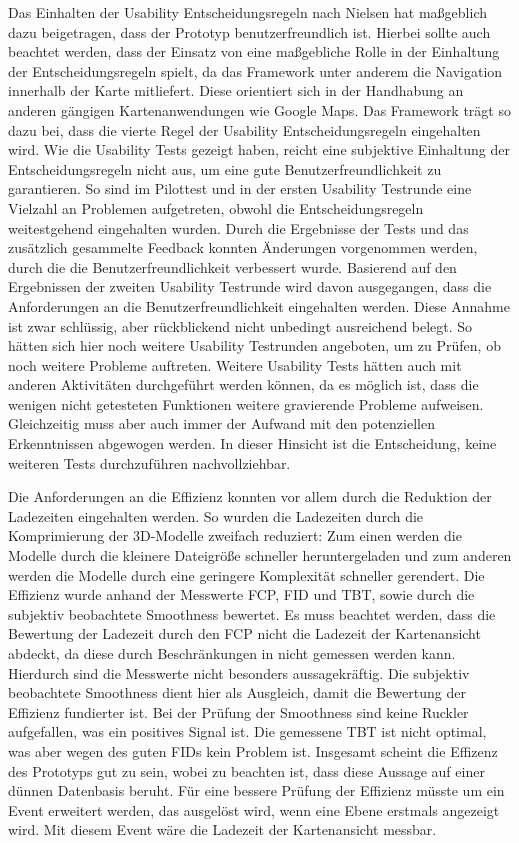 Das Einhalten der Usability Entscheidungsregeln nach Nielsen \cite{Nielsen.1994} hat maßgeblich dazu beigetragen, dass der Prototyp benutzerfreundlich ist. Hierbei sollte auch beachtet werden, dass der Einsatz von \deckgl{} eine maßgebliche Rolle in der Einhaltung der Entscheidungsregeln spielt, da das Framework unter anderem die Navigation innerhalb der Karte mitliefert. Diese orientiert sich in der Handhabung an anderen gängigen Kartenanwendungen wie Google Maps. Das Framework trägt so dazu bei, dass die vierte Regel der Usability Entscheidungsregeln \cite[Regel 4]{Nielsen.1994} eingehalten wird. Wie die Usability Tests gezeigt haben, reicht eine subjektive Einhaltung der Entscheidungsregeln nicht aus, um eine gute Benutzerfreundlichkeit zu garantieren. So sind im Pilottest und in der ersten Usability Testrunde eine Vielzahl an Problemen aufgetreten, obwohl die Entscheidungsregeln weitestgehend eingehalten wurden. Durch die Ergebnisse der Tests und das zusätzlich gesammelte Feedback konnten Änderungen vorgenommen werden, durch die die Benutzerfreundlichkeit verbessert wurde. Basierend auf den Ergebnissen der zweiten Usability Testrunde wird davon ausgegangen, dass die Anforderungen an die Benutzerfreundlichkeit eingehalten werden. Diese Annahme ist zwar schlüssig, aber rückblickend nicht unbedingt ausreichend belegt. So hätten sich hier noch weitere Usability Testrunden angeboten, um zu Prüfen, ob noch weitere Probleme auftreten. Weitere Usability Tests hätten auch mit anderen Aktivitäten durchgeführt werden können, da es möglich ist, dass die wenigen nicht getesteten Funktionen weitere gravierende Probleme aufweisen. Gleichzeitig muss aber auch immer der Aufwand mit den potenziellen Erkenntnissen abgewogen werden. In dieser Hinsicht ist die Entscheidung, keine weiteren Tests durchzuführen nachvollziehbar.

Die Anforderungen an die Effizienz konnten vor allem durch die Reduktion der Ladezeiten eingehalten werden. So wurden die Ladezeiten durch die Komprimierung der 3D-Modelle zweifach reduziert: Zum einen werden die Modelle durch die kleinere Dateigröße schneller heruntergeladen und zum anderen werden die Modelle durch eine geringere Komplexität schneller gerendert. Die Effizienz wurde anhand der Messwerte \ac{FCP}, \ac{FID} und \ac{TBT}, sowie durch die subjektiv beobachtete Smoothness bewertet. Es muss beachtet werden, dass die Bewertung der Ladezeit durch den \ac{FCP} nicht die Ladezeit der Kartenansicht abdeckt, da diese durch Beschränkungen in \deckgl{} nicht gemessen werden kann. Hierdurch sind die Messwerte nicht besonders aussagekräftig. Die subjektiv beobachtete Smoothness dient hier als Ausgleich, damit die Bewertung der Effizienz fundierter ist. Bei der Prüfung der Smoothness sind keine Ruckler aufgefallen, was ein positives Signal ist. Die gemessene \ac{TBT} ist nicht optimal, was aber wegen des guten \ac{FID}s kein Problem ist. Insgesamt scheint die Effizenz des Prototyps gut zu sein, wobei zu beachten ist, dass diese Aussage auf einer dünnen Datenbasis beruht. Für eine bessere Prüfung der Effizienz müsste \deckgl{} um ein Event erweitert werden, das ausgelöst wird, wenn eine Ebene erstmals angezeigt wird. Mit diesem Event wäre die Ladezeit der Kartenansicht messbar.

